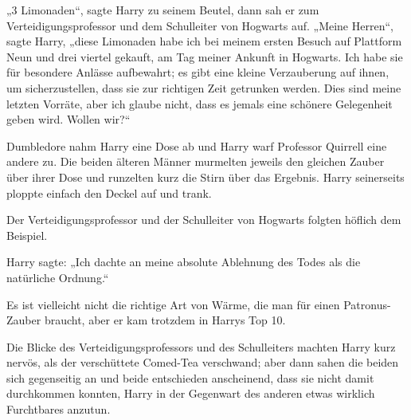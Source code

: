 „3 Limonaden“, sagte Harry zu seinem Beutel, dann sah er zum Verteidigungsprofessor und dem Schulleiter von Hogwarts auf. „Meine Herren“, sagte Harry, „diese Limonaden habe ich bei meinem ersten Besuch auf Plattform Neun und drei viertel gekauft, am Tag meiner Ankunft in Hogwarts. Ich habe sie für besondere Anlässe aufbewahrt; es gibt eine kleine Verzauberung auf ihnen, um sicherzustellen, dass sie zur richtigen Zeit getrunken werden. Dies sind meine letzten Vorräte, aber ich glaube nicht, dass es jemals eine schönere Gelegenheit geben wird. Wollen wir?“

Dumbledore nahm Harry eine Dose ab und Harry warf Professor Quirrell eine andere zu. Die beiden älteren Männer murmelten jeweils den gleichen Zauber über ihrer Dose und runzelten kurz die Stirn über das Ergebnis. Harry seinerseits ploppte einfach den Deckel auf und trank.

Der Verteidigungsprofessor und der Schulleiter von Hogwarts folgten höflich dem Beispiel.

Harry sagte: „Ich dachte an meine absolute Ablehnung des Todes als die natürliche Ordnung.“

Es ist vielleicht nicht die richtige Art von Wärme, die man für einen Patronus-Zauber braucht, aber er kam trotzdem in Harrys Top 10.

Die Blicke des Verteidigungsprofessors und des Schulleiters machten Harry kurz nervös, als der verschüttete Comed-Tea verschwand; aber dann sahen die beiden sich gegenseitig an und beide entschieden anscheinend, dass sie nicht damit durchkommen konnten, Harry in der Gegenwart des anderen etwas wirklich Furchtbares anzutun.

